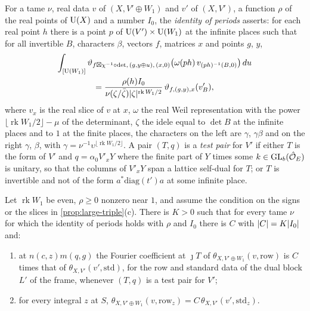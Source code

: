 For a tame $\nu$, real data $v$ of $(X,V'\oplus W_1)$ and $v'$ of $(X,V')$, a function $\rho$ of the real points of $\operatorname{U}(X)$ and a number $I_0$, the \emph{identity of periods} asserts: for each real point $h$
there is a point $p$ of $\operatorname{U}(V')\times\operatorname{U}(W_1)$ at the infinite places such that for all invertible $B$, characters $\beta$, vectors $f$, matrices $x$ and points $g$, $y$,
\begin{multline*}
  \int_{[\operatorname{U}(W_1)]}\vartheta_{f\boxtimes\chi^{-1}\circ\det,\,(g,y\oplus u),\,(x,0)}\bigl(\omega(ph)\,v_{(ph)^{-1}(B,0)}\bigr)\,du\\
  =\frac{\rho(h)I_0}{\nu(\zeta/\bar\zeta)\lvert \zeta\rvert^{\operatorname{rk}W_1/2}}\,\vartheta_{f,(g,y),x}(v'_B),
\end{multline*}
where $v_{x}$ is the real slice of $v$ at $x$, $\omega$ the real Weil representation with the power $\lfloor\operatorname{rk}W_1/2\rfloor-\mu$ of the determinant, $\zeta$ the idele equal to $\det B$ at the
infinite places and to $1$ at the finite places, the characters on the left are $\gamma$, $\gamma\beta$ and on the right $\gamma$, $\beta$, with $\gamma=\nu^{-1}\upsilon^{\lfloor\operatorname{rk}W_1/2\rfloor}$. A
pair $(T,q)$ is a \emph{test pair} for $V'$ if either $T$ is the form of $V'$ and $q=\alpha_0V'_xY$ where the finite part of $Y$ times some $k\in\operatorname{GL}_b(\hat{\mathcal{O}}_E)$ is unitary, so that the columns of $V'_xY$ span a lattice
self-dual for $T$; or $T$ is invertible and not of the form $a^*\mathrm{diag}(t')a$ at some infinite place.

\begin{lemma}\label{lem:periods-identity}
Let $\operatorname{rk}W_1$ be even, $\rho\ge0$ nonzero near $1$, and assume the condition on the signs or the slices in \cref{prop:large-triple}(c). There is $K>0$ such that for every tame $\nu$ for which the
identity of periods holds with $\rho$ and $I_0$ there is $C$ with $\lvert C\rvert=K\lvert I_0\rvert$ and:
\begin{enumerate}[label=\textup{(\alph*)}]
\item at $n(c,z)m(q,g)$ the Fourier coefficient at $\jmath T$ of $\theta_{X,V'\oplus W_1}(v,\mathrm{row})$ is $C$ times that of $\theta_{X,V'}(v',\mathrm{std})$, for the row and standard data of the dual block
$L'$ of the frame, whenever $(T,q)$ is a test pair for $V'$;
\item for every integral $z$ at $S$, $\theta_{X,V'\oplus W_1}(v,\mathrm{row}_z)=C\,\theta_{X,V'}(v',\mathrm{std}_z)$.
\end{enumerate}
\end{lemma}

